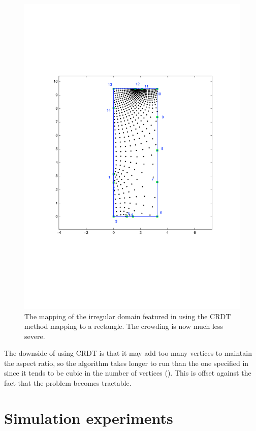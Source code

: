 \begin{figure} [tbp]
\centering
\includegraphics[scale=0.5]{sc/figs/irregular-fixed-crdt.pdf}
\caption{The mapping of the irregular domain featured in  using the CRDT method mapping to a rectangle. The crowding is now much less severe.}
\label{uncrowdeddisk}
\end{figure}

The downside of using CRDT is that it may add too many vertices to maintain the aspect ratio, so the algorithm takes longer to run than the one specified in  since it tends to be cubic in the number of vertices (\cite{driscoll05}). This is offset against the fact that the problem becomes tractable.

\section{Simulation experiments}

